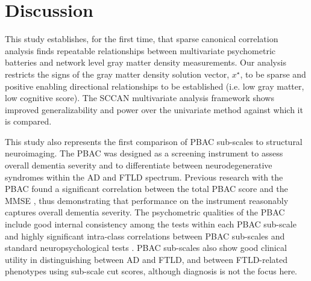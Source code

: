 \documentclass[preprint,authoryear,12pt]{elsarticle}
\begin{document}

\section{Discussion}
This study establishes, for the first time, that sparse canonical correlation analysis finds repeatable relationships between multivariate psychometric batteries and network level gray matter density measurements.  Our analysis restricts the signs of the gray matter density solution vector, $x^\star$, to be sparse and positive enabling directional relationships to be established (i.e. low gray matter, low cognitive score).  The SCCAN multivariate analysis framework shows improved generalizability and power over the univariate method against which it is compared.  

This study also represents the first comparison of PBAC sub-scales to structural neuroimaging. The PBAC was designed as a screening instrument to assess overall dementia severity and to differentiate between neurodegenerative syndromes within the AD and FTLD spectrum.  Previous research with the PBAC found a significant correlation between the total PBAC score and the MMSE \citet{Libon2007,libon_philadelphia_2011}, thus demonstrating that performance on the instrument reasonably captures overall dementia severity. The psychometric qualities of the PBAC include good internal consistency among the tests within each PBAC sub-scale and highly significant intra-class correlations between PBAC sub-scales and standard neuropsychological tests \citet{libon_philadelphia_2011}.  PBAC sub-scales also show good clinical utility in distinguishing between AD and FTLD, and between FTLD-related phenotypes using sub-scale cut scores, although diagnosis is not the focus here. 
\end{document}
